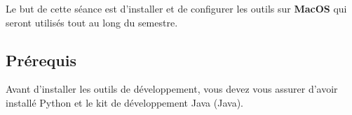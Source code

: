 
\usepackage{menukeys}
\usepackage{fontawesome6}
\usepackage{graphicx}
\usepackage{breakurl}

\usepackage{subcaption}



\ShowSolutiontrue
\ShowConseiltrue
\ShowWarningtrue
\ShowNotetrue

\titre
{}

Le but de cette séance est d'installer et de configurer les outils sur \textbf{MacOS} qui seront utilisés tout au long du semestre. 

\subsection*{Prérequis}
Avant d'installer les outils de développement, vous devez vous assurer d'avoir installé Python et le kit de développement Java (Java).
